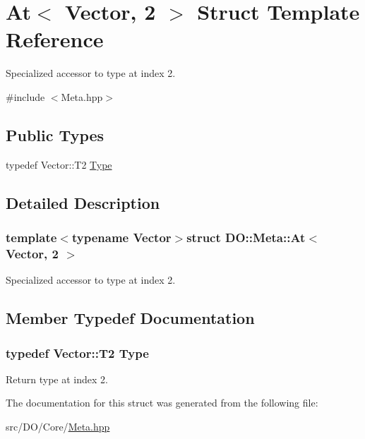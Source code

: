 \hypertarget{struct_d_o_1_1_meta_1_1_at_3_01_vector_00_012_01_4}{\section{At$<$ Vector, 2 $>$ Struct Template Reference}
\label{struct_d_o_1_1_meta_1_1_at_3_01_vector_00_012_01_4}
}


Specialized accessor to type at index 2.  




{\ttfamily \#include $<$Meta.\-hpp$>$}

\subsection*{Public Types}
\begin{DoxyCompactItemize}
\item 
typedef Vector\-::\-T2 \hyperlink{struct_d_o_1_1_meta_1_1_at_3_01_vector_00_012_01_4_a27f5c3afbabdcb5feb24b551b40f88e1}{Type}
\end{DoxyCompactItemize}


\subsection{Detailed Description}
\subsubsection*{template$<$typename Vector$>$struct D\-O\-::\-Meta\-::\-At$<$ Vector, 2 $>$}

Specialized accessor to type at index 2. 

\subsection{Member Typedef Documentation}
\hypertarget{struct_d_o_1_1_meta_1_1_at_3_01_vector_00_012_01_4_a27f5c3afbabdcb5feb24b551b40f88e1}{
\subsubsection[{Type}]{\setlength{\rightskip}{0pt plus 5cm}typedef Vector\-::\-T2 {\bf Type}}}\label{struct_d_o_1_1_meta_1_1_at_3_01_vector_00_012_01_4_a27f5c3afbabdcb5feb24b551b40f88e1}
Return type at index 2. 

The documentation for this struct was generated from the following file\-:\begin{DoxyCompactItemize}
\item 
src/\-D\-O/\-Core/\hyperlink{_meta_8hpp}{Meta.\-hpp}\end{DoxyCompactItemize}
